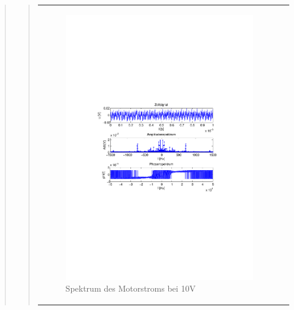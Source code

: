 \begin{quote}
\begin{quote}
\begin{center}
\begin{tabular}{ll}
\begin{minipage}{0.6\textwidth}
                        \begin{figure}[H]
                            \label{fig:}
                            \includegraphics[scale=0.63, trim = 3cm 9cm 3cm
                            8.5cm, clip]{./Bilder/ampl_spektrum_messung1}
                            \caption{Spektrum des Motorstroms bei 10V}
                        \end{figure}
    
                    \end{minipage}
                    \begin{minipage}{0.6\textwidth}
    

\end{minipage}
\end{tabular}
\end{center}
\end{quote}
\end{quote}
